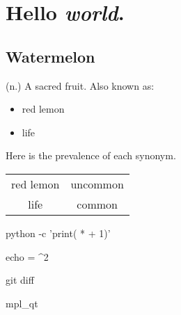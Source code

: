 

\section{Hello \textit{world}.}

\subsection{Watermelon}

(n.) A sacred fruit. Also known as:

\begin{itemize}
\item red lemon
\item life
\end{itemize}

Here is the prevalence of each synonym.

\begin{tabular}{c c}
red lemon & uncommon \\
life & common
\end{tabular}

\begin{codesnip}
    python -c 'print( *  + 1)'
\end{codesnip}

\begin{codesnip}
    echo  = ^2
\end{codesnip}

\begin{codesnip}
    git diff 
\end{codesnip}

\begin{codesnip}
    mpl_qt
\end{codesnip}



